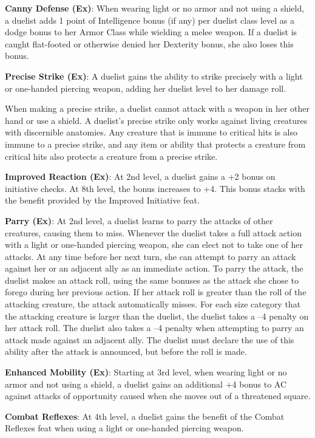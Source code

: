 \textbf{Canny Defense (Ex)}: When wearing light or no armor and not using a shield, a duelist adds 1 point of Intelligence bonus (if any) per duelist class level as a dodge bonus to her Armor Class while wielding a melee weapon. If a duelist is caught flat-footed or otherwise denied her Dexterity bonus, she also loses this bonus.
				
\textbf{Precise Strike (Ex)}: A duelist gains the ability to strike precisely with a light or one-handed piercing weapon, adding her duelist level to her damage roll.
				
When making a precise strike, a duelist cannot attack with a weapon in her other hand or use a shield. A duelist's precise strike only works against living creatures with discernible anatomies. Any creature that is immune to critical hits is also immune to a precise strike, and any item or ability that protects a creature from critical hits also protects a creature from a precise strike.
				
\textbf{Improved Reaction (Ex)}: At 2nd level, a duelist gains a +2 bonus on initiative checks. At 8th level, the bonus increases to +4. This bonus stacks with the benefit provided by the Improved Initiative feat.
				
\textbf{Parry (Ex)}: At 2nd level, a duelist learns to parry the attacks of other creatures, causing them to miss. Whenever the duelist takes a full attack action with a light or one-handed piercing weapon, she can elect not to take one of her attacks. At any time before her next turn, she can attempt to parry an attack against her or an adjacent ally as an immediate action. To parry the attack, the duelist makes an attack roll, using the same bonuses as the attack she chose to forego during her previous action. If her attack roll is greater than the roll of the attacking creature, the attack automatically misses. For each size category that the attacking creature is larger than the duelist, the duelist takes a --4 penalty on her attack roll. The duelist also takes a --4 penalty when attempting to parry an attack made against an adjacent ally. The duelist must declare the use of this ability after the attack is announced, but before the roll is made.
				
\textbf{Enhanced Mobility (Ex)}: Starting at 3rd level, when wearing light or no armor and not using a shield, a duelist gains an additional +4 bonus to AC against attacks of opportunity caused when she moves out of a threatened square.
				
\textbf{Combat Reflexes}: At 4th level, a duelist gains the benefit of the Combat Reflexes feat when using a light or one-handed piercing weapon.
				
